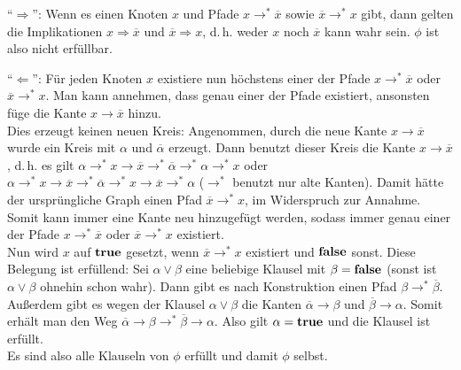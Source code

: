 \begin{Beweis}
    "`$\Rightarrow$"':
    Wenn es einen Knoten $x$ und
    Pfade $x \rightarrow^\ast \overline{x}$ sowie $\overline{x} \rightarrow^\ast x$ gibt,
    dann gelten die Implikationen $x \Rightarrow \overline{x}$ und
    $\overline{x} \Rightarrow x$, d.\,h. weder $x$ noch $\overline{x}$ kann wahr sein.
    $\phi$ ist also nicht erfüllbar.
    
    "`$\Leftarrow$"':
    Für jeden Knoten $x$ existiere nun höchstens einer der Pfade
    $x \rightarrow^\ast \overline{x}$ oder $\overline{x} \rightarrow^\ast x$.
    Man kann annehmen, dass genau einer der Pfade existiert,
    ansonsten füge die Kante $x \rightarrow \overline{x}$ hinzu.\\
    Dies erzeugt keinen neuen Kreis:
    Angenommen, durch die neue Kante $x \rightarrow \overline{x}$ wurde ein
    Kreis mit $\alpha$ und $\overline{\alpha}$ erzeugt.
    Dann benutzt dieser Kreis die Kante $x \rightarrow \overline{x}$, d.\,h.
    es gilt $\alpha \rightarrow^\ast x \rightarrow \overline{x} \rightarrow^\ast
    \overline{\alpha} \rightarrow^\ast \alpha \rightarrow^\ast x$
    oder $\alpha \rightarrow^\ast x \rightarrow \overline{x} \rightarrow^\ast
    \overline{\alpha} \rightarrow^\ast x \rightarrow \overline{x} \rightarrow^\ast \alpha$
    ($\rightarrow^\ast$ benutzt nur alte Kanten).
    Damit hätte der ursprüngliche Graph einen Pfad $\overline{x} \rightarrow^\ast x$,
    im Widerspruch zur Annahme.
    Somit kann immer eine Kante neu hinzugefügt werden, sodass immer
    genau einer der Pfade $x \rightarrow^\ast \overline{x}$ oder $\overline{x} \rightarrow^\ast x$
    existiert.\\
    Nun wird $x$ auf $\mathbf{true}$ gesetzt, wenn $\overline{x} \rightarrow^\ast x$ existiert
    und $\mathbf{false}$ sonst.
    Diese Belegung ist erfüllend:
    Sei $\alpha \lor \beta$ eine beliebige Klausel mit $\beta = \mathbf{false}$
    (sonst ist $\alpha \lor \beta$ ohnehin schon wahr).
    Dann gibt es nach Konstruktion einen Pfad $\beta \rightarrow^\ast \overline{\beta}$.
    Außerdem gibt es wegen der Klausel $\alpha \lor \beta$ die Kanten
    $\overline{\alpha} \rightarrow \beta$ und $\overline{\beta} \rightarrow \alpha$.
    Somit erhält man den Weg
    $\overline{\alpha} \rightarrow \beta \rightarrow^\ast \overline{\beta} \rightarrow \alpha$.
    Also gilt $\alpha = \mathbf{true}$ und die Klausel ist erfüllt.\\
    Es sind also alle Klauseln von $\phi$ erfüllt und damit $\phi$ selbst.
\end{Beweis}

\pagebreak

